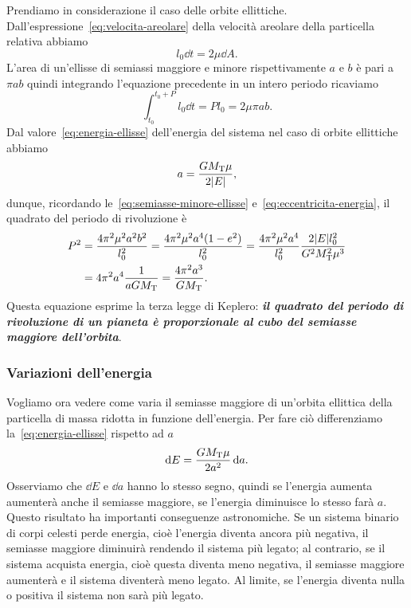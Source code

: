 {Prendiamo in considerazione il caso delle orbite
ellittiche. Dall'espressione~\eqref{eq:velocita-areolare} della velocità
areolare della particella relativa abbiamo
\begin{equation}
  l_0 \dd t = 2\mu\dd A.
\end{equation}
L'area di un'ellisse di semiassi maggiore e minore rispettivamente $a$ e $b$ è
pari a $\pi ab$ quindi integrando l'equazione precedente in un intero periodo
ricaviamo
\begin{equation}
    \int_{t_0}^{t_0+P} l_0\dd t = Pl_0 = 2\mu\pi ab.
\end{equation}
Dal valore~\eqref{eq:energia-ellisse} dell'energia del sistema nel caso di
orbite ellittiche abbiamo
\begin{equation}
  a = \frac{GM_\textup{T}\mu}{2\lvert E\rvert},
\end{equation}
dunque, ricordando le~\eqref{eq:semiasse-minore-ellisse}
e~\eqref{eq:eccentricita-energia}, il quadrato del periodo di rivoluzione è
\begin{equation}
  \label{eq:terza-legge-keplero}
  \begin{split}
    P^2 &= \frac{4\pi^2\mu^2a^2b^2}{l_0^2} = \frac{4\pi^2\mu^2a^4(1-e^2)}{l_0^2}
    = \frac{4\pi^2\mu^2a^4}{l_0^2}\frac{2\lvert E\rvert l_0^2}{G^2M_\textup{T}^2\mu^3} \\
    &= 4\pi^2a^4\frac{1}{aGM_\textup{T}} = \frac{4\pi^2a^3}{GM_\textup{T}}.
  \end{split}
\end{equation}
Questa equazione esprime la terza legge di Keplero: \textbf{\emph{il quadrato
    del periodo di rivoluzione di un pianeta è proporzionale al cubo del
    semiasse maggiore dell'orbita}}.

\subsubsection{Variazioni dell'energia}
\label{sec:variazioni energia}

Vogliamo ora vedere come varia il semiasse maggiore di un'orbita ellittica della
particella di massa ridotta in funzione dell'energia. Per fare ciò differenziamo
la~\eqref{eq:energia-ellisse} rispetto ad $a$
\begin{equation}
  \mathop{}\!\mathrm{d} E = \frac{GM_\textup{T}\mu}{2a^2}\mathop{}\!\mathrm{d} a.
\end{equation}
Osserviamo che $\dd E$ e $\dd a$ hanno lo stesso segno, quindi se l'energia
aumenta aumenterà anche il semiasse maggiore, se l'energia diminuisce lo stesso
farà $a$. Questo risultato ha importanti conseguenze astronomiche. Se un sistema
binario di corpi celesti perde energia, cioè l'energia diventa ancora più
negativa, il semiasse maggiore diminuirà rendendo il sistema più legato; al
contrario, se il sistema acquista energia, cioè questa diventa meno negativa, il
semiasse maggiore aumenterà e il sistema diventerà meno legato. Al limite, se
l'energia diventa nulla o positiva il sistema non sarà più legato.

}
